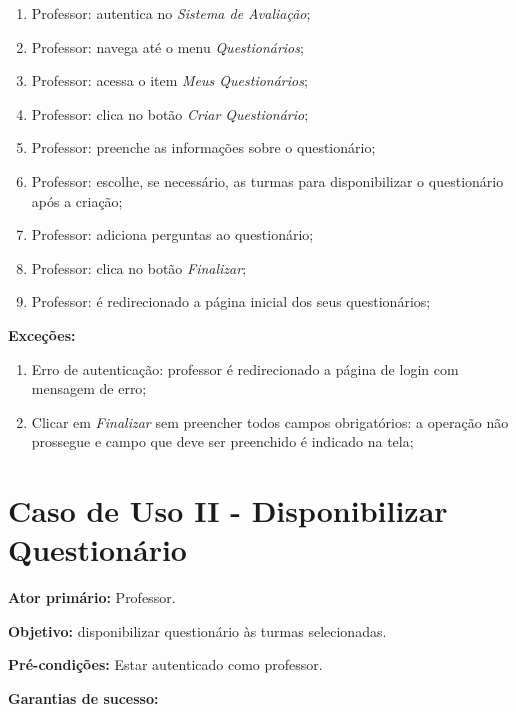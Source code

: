 \documentclass[
  12pt,       %
  openright,      %
  oneside,      %
  a4paper,      %
  english,      %
  french,        %
  spanish,     %
  brazil        %
  ]{abntex2-decsi}
\begin{document}
\begin{apendicesenv}
          \begin{enumerate}
              \item Professor: autentica no \textit{Sistema de Avaliação};
              \item Professor: navega até o menu \textit{Questionários};
              \item Professor: acessa o item \textit{Meus Questionários};
              \item Professor: clica no botão \textit{Criar Questionário};
              \item Professor: preenche as informações sobre o questionário;
              \item Professor: escolhe, se necessário, as turmas para disponibilizar o questionário após a criação;
              \item Professor: adiciona perguntas ao questionário;
              \item Professor: clica no botão \textit{Finalizar};
              \item Professor: é redirecionado a página inicial dos seus questionários;
          \end{enumerate}

          \textbf{Exceções:}

              \begin{enumerate}	
                  \item Erro de autenticação: professor é redirecionado a página de login com mensagem de erro;
                  \item Clicar em \textit{Finalizar} sem preencher todos campos obrigatórios: a operação não prossegue e campo que deve ser preenchido é indicado na tela;
              \end{enumerate}
    
     \newpage
     
    \section{Caso de Uso II - Disponibilizar Questionário}
    
      \textbf{Ator primário:} Professor.

      \textbf{Objetivo:} disponibilizar questionário às turmas selecionadas.

      \textbf{Pré-condições:} Estar autenticado como professor.

      \textbf{Garantias de sucesso:} 

              \begin{enumerate}


\end{enumerate}
\end{apendicesenv}
\end{document}
